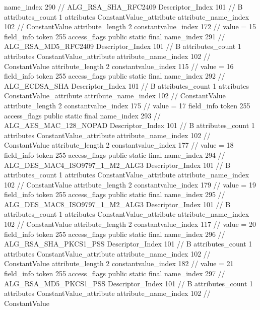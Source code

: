 {{{{{				name_index	290		// ALG_RSA_SHA_RFC2409
				Descriptor_Index	101		// B
				attributes_count	1
				attributes {
				ConstantValue_attribute {
					attribute_name_index	102		// ConstantValue
					attribute_length	2
					constantvalue_index	172		// value = 15
				}
				}
			}
			field_info {
				token	255
				access_flags	public static final
				name_index	291		// ALG_RSA_MD5_RFC2409
				Descriptor_Index	101		// B
				attributes_count	1
				attributes {
				ConstantValue_attribute {
					attribute_name_index	102		// ConstantValue
					attribute_length	2
					constantvalue_index	115		// value = 16
				}
				}
			}
			field_info {
				token	255
				access_flags	public static final
				name_index	292		// ALG_ECDSA_SHA
				Descriptor_Index	101		// B
				attributes_count	1
				attributes {
				ConstantValue_attribute {
					attribute_name_index	102		// ConstantValue
					attribute_length	2
					constantvalue_index	175		// value = 17
				}
				}
			}
			field_info {
				token	255
				access_flags	public static final
				name_index	293		// ALG_AES_MAC_128_NOPAD
				Descriptor_Index	101		// B
				attributes_count	1
				attributes {
				ConstantValue_attribute {
					attribute_name_index	102		// ConstantValue
					attribute_length	2
					constantvalue_index	177		// value = 18
				}
				}
			}
			field_info {
				token	255
				access_flags	public static final
				name_index	294		// ALG_DES_MAC4_ISO9797_1_M2_ALG3
				Descriptor_Index	101		// B
				attributes_count	1
				attributes {
				ConstantValue_attribute {
					attribute_name_index	102		// ConstantValue
					attribute_length	2
					constantvalue_index	179		// value = 19
				}
				}
			}
			field_info {
				token	255
				access_flags	public static final
				name_index	295		// ALG_DES_MAC8_ISO9797_1_M2_ALG3
				Descriptor_Index	101		// B
				attributes_count	1
				attributes {
				ConstantValue_attribute {
					attribute_name_index	102		// ConstantValue
					attribute_length	2
					constantvalue_index	117		// value = 20
				}
				}
			}
			field_info {
				token	255
				access_flags	public static final
				name_index	296		// ALG_RSA_SHA_PKCS1_PSS
				Descriptor_Index	101		// B
				attributes_count	1
				attributes {
				ConstantValue_attribute {
					attribute_name_index	102		// ConstantValue
					attribute_length	2
					constantvalue_index	182		// value = 21
				}
				}
			}
			field_info {
				token	255
				access_flags	public static final
				name_index	297		// ALG_RSA_MD5_PKCS1_PSS
				Descriptor_Index	101		// B
				attributes_count	1
				attributes {
				ConstantValue_attribute {
					attribute_name_index	102		// ConstantValue
}}}}}}}
